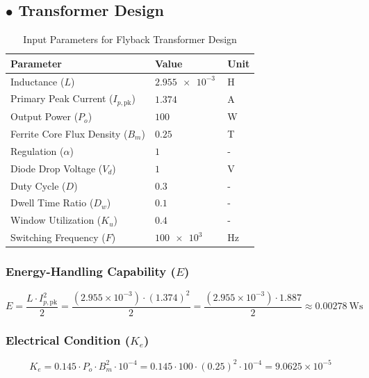 \subsection*{$\bullet$ Transformer Design}
\begin{table}[h!]
 \caption{Input Parameters for Flyback Transformer Design}
    \label{tab:input_parameters}
    \centering
    \begin{tabular}{l l l}
    \toprule
    \textbf{Parameter} & \textbf{Value} & \textbf{Unit} \\
    \midrule
    Inductance ($L$) & $\SI{2.955e-3}{}$ & \si{\henry} \\
    Primary Peak Current ($I_{p,\text{pk}}$) & $\SI{1.374}{}$ & \si{\ampere} \\
    Output Power ($P_o$) & $\SI{100}{}$ & \si{\watt} \\
    Ferrite Core Flux Density ($B_m$) & $\SI{0.25}{}$ & \si{\tesla} \\
    Regulation ($\alpha$) & $1$ & - \\
    Diode Drop Voltage ($V_d$) & $\SI{1}{}$ & \si{\volt} \\
    Duty Cycle ($D$) & $0.3$ & - \\
    Dwell Time Ratio ($D_w$) & $0.1$ & - \\
    Window Utilization ($K_u$) & $0.4$ & - \\
    Switching Frequency ($F$) & $\SI{100e3}{}$ & \si{\hertz} \\
    \bottomrule
    \end{tabular}
\end{table}
\subsubsection*{Energy-Handling Capability ($E$)}
\[
E = \frac{L \cdot I_{p,\text{pk}}^2}{2} = \frac{(2.955 \times 10^{-3}) \cdot (1.374)^2}{2} = \frac{(2.955 \times 10^{-3}) \cdot 1.887}{2} \approx \SI{0.00278}{\watt\second}
\]
\subsubsection*{Electrical Condition ($K_e$)}
\[
K_e = 0.145 \cdot P_o \cdot B_m^2 \cdot 10^{-4} = 0.145 \cdot 100 \cdot (0.25)^2 \cdot 10^{-4} = 9.0625 \times 10^{-5}
\]
